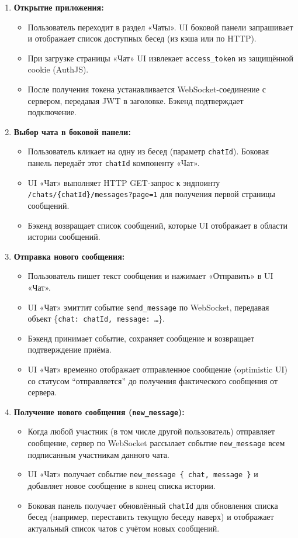 \begin{enumerate}
    \item \textbf{Открытие приложения:}
    \begin{itemize}
        \item Пользователь переходит в раздел «Чаты». UI боковой панели запрашивает и отображает список доступных бесед (из кэша или по HTTP).
        \item При загрузке страницы «Чат» UI извлекает \texttt{access\_token} из защищённой cookie (AuthJS).
        \item После получения токена устанавливается WebSocket-соединение с сервером, передавая JWT в заголовке. Бэкенд подтверждает подключение.
    \end{itemize}

    \item \textbf{Выбор чата в боковой панели:}
    \begin{itemize}
        \item Пользователь кликает на одну из бесед (параметр \texttt{chatId}). Боковая панель передаёт этот \texttt{chatId} компоненту «Чат».
        \item UI «Чат» выполняет HTTP GET-запрос к эндпоинту \texttt{/chats/\{chatId\}/messages?page=1} для получения первой страницы сообщений.
        \item Бэкенд возвращает список сообщений, которые UI отображает в области истории сообщений.
    \end{itemize}

    \item \textbf{Отправка нового сообщения:}
    \begin{itemize}
        \item Пользователь пишет текст сообщения и нажимает «Отправить» в UI «Чат».
        \item UI «Чат» эмиттит событие \texttt{send\_message} по WebSocket, передавая объект \{\texttt{chat: chatId, message: {…}}\}.
        \item Бэкенд принимает событие, сохраняет сообщение и возвращает подтверждение приёма.
        \item UI «Чат» временно отображает отправленное сообщение (optimistic UI) со статусом “отправляется” до получения фактического сообщения от сервера.
    \end{itemize}

    \item \textbf{Получение нового сообщения (\texttt{new\_message}):}
    \begin{itemize}
        \item Когда любой участник (в том числе другой пользователь) отправляет сообщение, сервер по WebSocket рассылает событие \texttt{new\_message} всем подписанным участникам данного чата.
        \item UI «Чат» получает событие \texttt{new\_message \{ chat, message \}} и добавляет новое сообщение в конец списка истории.
        \item Боковая панель получает обновлённый \texttt{chatId} для обновления списка бесед (например, переставить текущую беседу наверх) и отображает актуальный список чатов с учётом новых сообщений.
    \end{itemize}


\end{enumerate}

